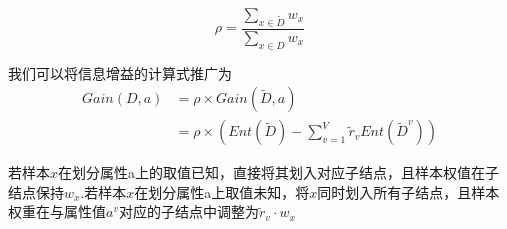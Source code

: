 \documentclass[UTF8]{article}
\begin{document}
\begin{equation}
  \rho = \frac{\sum_{x \in \tilde{D}}w_x}{\sum_{x \in D}w_x}
\end{equation}

我们可以将信息增益的计算式推广为
\begin{equation}
  \begin{split}
  Gain(D, a) &= \rho \times Gain(\tilde{D}, a) \\
  &= \rho \times (Ent(\tilde{D}) - \sum_{v=1}^{V} \tilde{r}_v Ent(\tilde{D}^v))
\end{split}
\end{equation}

若样本$x$在划分属性a上的取值已知，直接将其划入对应子结点，且样本权值在子结点保持$w_x$.若样本$x$在划分属性a上取值未知，将$x$同时划入所有子结点，且样本权重在与属性值$a^v$对应的子结点中调整为$\tilde{r}_v \cdot w_x$
\end{document}
